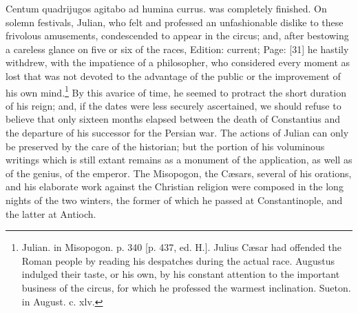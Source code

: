 {Centum quadrijugos agitabo ad humina currus.} was completely finished. On solemn festivals, Julian, who felt and professed an unfashionable dislike to these frivolous amusements, condescended to appear in the circus; and, after bestowing a careless glance on five or six of the races, Edition: current; Page: [31] he hastily withdrew, with the impatience of a philosopher, who considered every moment as lost that was not devoted to the advantage of the public or the improvement of his own mind.\footnote{Julian. in Misopogon. p. 340 [p. 437, ed. H.]. Julius Cæsar had offended the Roman people by reading his despatches during the actual race. Augustus indulged their taste, or his own, by his constant attention to the important business of the circus, for which he professed the warmest inclination. Sueton. in August. c. xlv.} By this avarice of time, he seemed to protract the short duration of his reign; and, if the dates were less securely ascertained, we should refuse to believe that only sixteen months elapsed between the death of Constantius and the departure of his successor for the Persian war. The actions of Julian can only be preserved by the care of the historian; but the portion of his voluminous writings which is still extant remains as a monument of the application, as well as of the genius, of the emperor. The Misopogon, the Cæsars, several of his orations, and his elaborate work against the Christian religion were composed in the long nights of the two winters, the former of which he passed at Constantinople, and the latter at Antioch.

